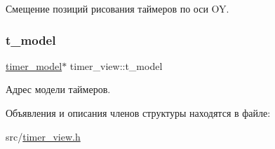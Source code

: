 Смещение позиций рисования таймеров по оси OY. 

\mbox{\label{structtimer__view_a016f2b9a9c2d969b5a92f7d1a893bd3d}} 
\subsubsection{\texorpdfstring{t\+\_\+model}{t\_model}}
{\footnotesize\ttfamily \hyperlink{structtimer__model}{timer\+\_\+model}$\ast$ timer\+\_\+view\+::t\+\_\+model}



Адрес модели таймеров. 



Объявления и описания членов структуры находятся в файле\+:\begin{DoxyCompactItemize}
\item 
src/\hyperlink{timer__view_8h}{timer\+\_\+view.\+h}\end{DoxyCompactItemize}
